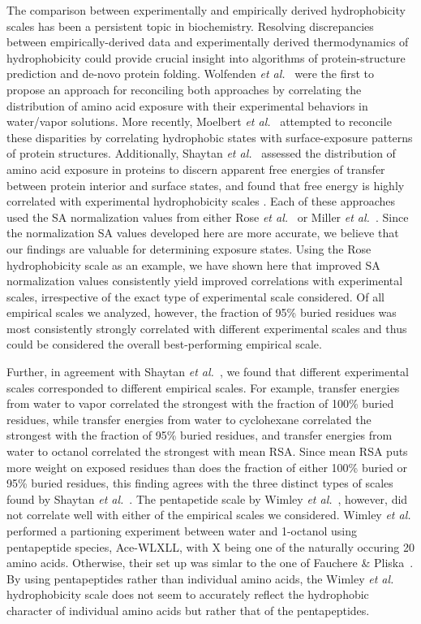 \documentclass[11pt]{article}
\begin{document}
The comparison between experimentally and empirically derived hydrophobicity scales has been a persistent topic in biochemistry. Resolving discrepancies between empirically-derived data and experimentally derived thermodynamics of hydrophobicity could provide crucial insight into algorithms of protein-structure prediction and de-novo protein folding. Wolfenden \emph{et al.}~\cite{Wolfenden1981} were the first to propose an approach for reconciling both approaches by correlating the distribution of amino acid exposure with their experimental behaviors in water/vapor solutions. More recently, Moelbert \emph{et al.}~\cite{Moelbert2004} attempted to reconcile these disparities by correlating hydrophobic states with surface-exposure patterns of protein structures. Additionally, Shaytan \emph{et al.}~\cite{Shaytan2009} assessed the distribution of amino acid exposure in proteins to discern apparent free energies of transfer between protein interior and surface states, and found that free energy is highly correlated with experimental hydrophobicity scales \cite{Shaytan2009}. Each of these approaches used the SA normalization values from either Rose \emph{et al.}~\cite{Rose1985} or Miller \emph{et al.}~\cite{Miller1987}. Since the normalization SA values developed here are more accurate, we believe that our findings are valuable for determining exposure states. Using the Rose hydrophobicity scale as an example, we have shown here that improved SA normalization values consistently yield improved correlations with experimental scales, irrespective of the exact type of experimental scale considered.  Of all empirical scales we analyzed, however, the fraction of 95\% buried residues was most consistently strongly correlated with different experimental scales and thus could be considered the overall best-performing empirical scale.

Further, in agreement with Shaytan \emph{et al.}~\cite{Shaytan2009}, we found that different experimental scales corresponded to different empirical scales. For example, transfer energies from water to vapor correlated the strongest with the fraction of 100\% buried residues, while transfer energies from water to cyclohexane correlated the strongest with the fraction of 95\% buried residues, and transfer energies from water to octanol correlated the strongest with mean RSA. Since mean RSA puts more weight on exposed residues than does the fraction of either 100\% buried or 95\% buried residues, this finding agrees with the three distinct types of scales found by Shaytan \emph{et al.}~\cite{Shaytan2009}. The pentapetide scale by Wimley \emph{et al.}~\cite{Wimley1996}, however, did not correlate well with either of the empirical scales we considered. Wimley \emph{et al.} performed a partioning experiment between water and 1-octanol using pentapeptide species, Ace-WLXLL, with X being one of the naturally occuring 20 amino acids. Otherwise, their set up was simlar to the one of Fauchere \& Pliska~\cite{Fauchere1983}. By using pentapeptides rather than individual amino acids, the Wimley \emph{et al.} hydrophobicity scale does not seem to accurately reflect the hydrophobic character of individual amino acids but rather that of the pentapeptides.
\end{document}
